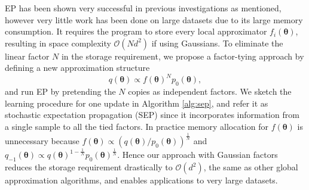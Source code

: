 EP has been shown very successful in previous investigations as mentioned, however very little work has been done on large datasets due to its large memory consumption. It requires the program to store every local approximator $f_i(\bm{\theta})$, resulting in space complexity $\mathcal{O}(Nd^2)$ if using Gaussians. To eliminate the linear factor $N$ in the storage requirement, we propose a factor-tying approach by defining a new approximation structure
\begin{equation}
q(\bm{\theta}) \propto f(\bm{\theta})^N p_0(\bm{\theta}),
\end{equation}
and run EP by pretending the $N$ copies as independent factors. We sketch the learning procedure for one update in Algorithm \ref{alg:sep}, and refer it as stochastic expectation propagation (SEP) since it incorporates information from a single sample to all the tied factors. In practice memory allocation for $f(\bm{\theta})$ is unnecessary because $f(\bm{\theta}) \propto (q(\bm{\theta}) / p_0(\bm{\theta}))^{\frac{1}{N}}$ and $q_{-1}(\bm{\theta}) \propto q(\bm{\theta})^{1 - \frac{1}{N}} p_0(\bm{\theta})^{\frac{1}{N}}$. Hence our approach with Gaussian factors reduces the storage requirement drastically to $\mathcal{O}(d^2)$, the same as other global approximation algorithms, and enables applications to very large datasets. 

